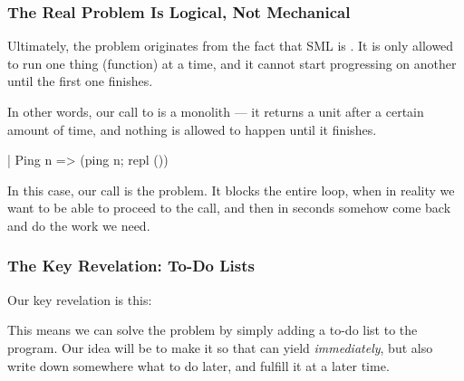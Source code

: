 \documentclass[aspectratio=169]{beamer}
\begin{document}
\begin{frame}[fragile]
  \frametitle{The Real Problem Is Logical, Not Mechanical}

  Ultimately, the problem originates from the fact that SML is
  . It is only allowed to run one thing
  (function) at a time, and it cannot start progressing on another
  until the first one finishes.

  \pause
  \vspace{\fill}

  In other words, our call to  is a monolith
  --- it returns a unit after a certain amount of time, and nothing is allowed
  to happen until it finishes.

  \begin{codeblock}
    | Ping n => (ping n; repl ())
\end{codeblock}

  \pause
  \vspace{\fill}

  In this case, our  call is the problem. It blocks the entire loop,
  when in reality we want to be able to proceed to the  call,
  and then in  seconds somehow come back and do the work
  we need.
\end{frame}

\begin{frame}[fragile]
  \frametitle{The Key Revelation: To-Do Lists}

  Our key revelation is this:

  \pause
  \vspace{10pt}


  \pause
  \vspace{\fill}

  This means we can solve the problem by simply adding a to-do list to
  the program. Our idea will be to make it so that  can
  yield \textit{immediately}, but also write down somewhere what to
  do later, and fulfill it at a later time.
\end{frame}
\end{document}
